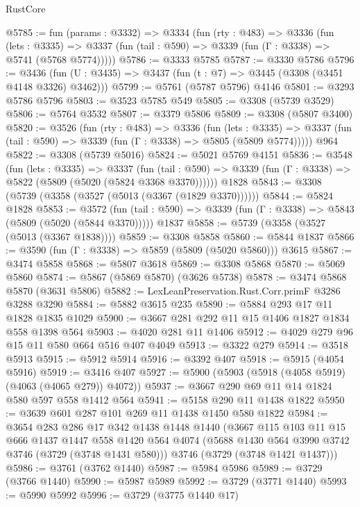 \begin{lexlean}{RustCore}
\begin{coremodule}
@5785 := fun (params : @3332) =>
  @3334
    (fun (rty : @483) =>
    @3336
      (fun (lets : @3335) =>
      @3337 (fun (tail : @590) => @3339 (fun (Γ : @3338) => @5741 (@5768 @5774)))))
@5786 := @3333 @5785
@5787 := @3330 @5786
@5796 := @3436 (fun (U : @3435) => @3437 (fun (t : @7) => @3445 (@3308 (@3451 @4148 @3326) @3462)))
@5799 := @5761 (@5787 @5796) @4146
@5801 := @3293 @5786 @5796
@5803 := @3523 @5785 @549
@5805 := @3308 (@5739 @3529)
@5806 := @5764 @3532
@5807 := @3379 @5806
@5809 := @3308 (@5807 @3400)
@5820 := @3526
    (fun (rty : @483) =>
    @3336
      (fun (lets : @3335) =>
      @3337 (fun (tail : @590) => @3339 (fun (Γ : @3338) => @5805 (@5809 @5774)))))
    @964
@5822 := @3308 (@5739 @5016)
@5824 := @5021 @5769 @4151
@5836 := @3548
    (fun (lets : @3335) =>
    @3337
      (fun (tail : @590) => @3339 (fun (Γ : @3338) => @5822 (@5809 (@5020 (@5824 @3368 @3370))))))
    @1828
@5843 := @3308 (@5739 (@3358 (@3527 (@5013 (@3367 (@1829 @3370))))))
@5844 := @5824 @1828
@5853 := @3572
    (fun (tail : @590) => @3339 (fun (Γ : @3338) => @5843 (@5809 (@5020 (@5844 @3370)))))
    @1837
@5858 := @5739 (@3358 (@3527 (@5013 (@3367 @1838))))
@5859 := @3308 @5858
@5860 := @5844 @1837
@5866 := @3590 (fun (Γ : @3338) => @5859 (@5809 (@5020 @5860))) @3615
@5867 := @3474 @5858
@5868 := @5807 @3618
@5869 := @3308 @5868
@5870 := @5069 @5860
@5874 := @5867 (@5869 @5870) (@3626 @5738)
@5878 := @3474 @5868 @5870 (@3631 @5806)
@5882 := LexLeanPreservation.Rust.Corr.primF @3286 @3288 @3290
@5884 := @5882 @3615 @235
@5890 := @5884 @293 @17 @11 @1828 @1835 @1029
@5900 := @3667 @281 @292 @11 @15 @1406 @1827 @1834 @558 @1398 @564
@5903 := @4020 @281 @11 @1406
@5912 := @4029 @279 @96 @15 @11 @580 @664 @516 @407 @4049
@5913 := @3322 @279
@5914 := @3518 @5913
@5915 := @5912 @5914
@5916 := @3392 @407
@5918 := @5915 (@4054 @5916)
@5919 := @3416 @407
@5927 := @5900 (@5903 (@5918 (@4058 @5919) (@4063 (@4065 @279)) @4072))
@5937 := @3667 @290 @69 @11 @14 @1824 @580 @597 @558 @1412 @564
@5941 := @5158 @290 @11 @1438 @1822
@5950 := @3639 @601 @287 @101 @269 @11 @1438 @1450 @580 @1822
@5984 := @3654
    @283
    @286
    @17
    @342
    @1438
    @1448
    @1440
    (@3667
      @115
      @103
      @11
      @15
      @666
      @1437
      @1447
      @558
      @1420
      @564
      @4074
      (@5688 @1430 @564 @3990 @3742 @3746 (@3729 (@3748 @1431 @580)))
      @3746
      (@3729 (@3748 @1421 @1437)))
@5986 := @3761 (@3762 @1440)
@5987 := @5984 @5986
@5989 := @3729 (@3766 @1440)
@5990 := @5987 @5989
@5992 := @3729 (@3771 @1440)
@5993 := @5990 @5992
@5996 := @3729 (@3775 @1440 @17)

\end{coremodule}
\end{lexlean}
